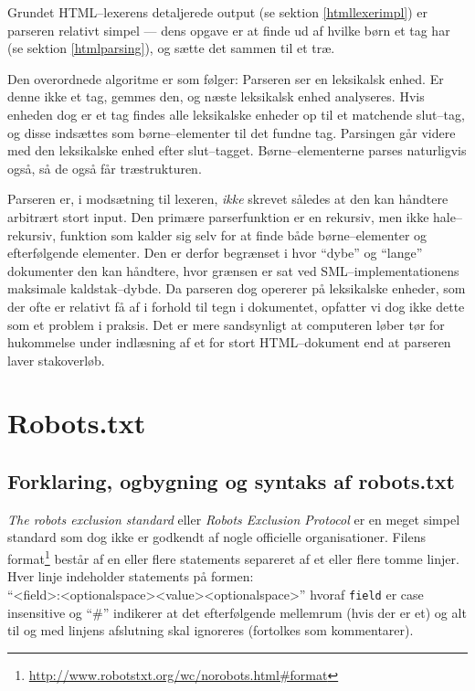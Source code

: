 \documentclass[a4paper,oneside]{memoir}
\begin{document}
Grundet HTML--lexerens detaljerede output (se sektion
\ref{htmllexerimpl}) er parseren relativt simpel --- dens opgave er at
finde ud af hvilke børn et tag har (se sektion \ref{htmlparsing}), og
sætte det sammen til et træ.

Den overordnede algoritme er som følger: Parseren ser en leksikalsk
enhed. Er denne ikke et tag, gemmes den, og næste leksikalsk enhed
analyseres. Hvis enheden dog er et tag findes alle leksikalske enheder
op til et matchende slut--tag, og disse indsættes som børne--elementer
til det fundne tag. Parsingen går videre med den leksikalske enhed
efter slut--tagget. Børne--elementerne parses naturligvis også, så de
også får træstrukturen.

Parseren er, i modsætning til lexeren, \textit{ikke} skrevet således
at den kan håndtere arbitrært stort input. Den primære parserfunktion
er en rekursiv, men ikke hale--rekursiv, funktion som kalder sig selv
for at finde både børne--elementer og efterfølgende elementer. Den er
derfor begrænset i hvor ``dybe'' og ``lange'' dokumenter den kan
håndtere, hvor grænsen er sat ved SML--implementationens maksimale
kaldstak--dybde. Da parseren dog opererer på leksikalske enheder, som
der ofte er relativt få af i forhold til tegn i dokumentet, opfatter
vi dog ikke dette som et problem i praksis. Det er mere sandsynligt at
computeren løber tør for hukommelse under indlæsning af et for stort
HTML--dokument end at parseren laver stakoverløb.

\section{Robots.txt}
\label{robots} 


\subsection{Forklaring, ogbygning og syntaks af robots.txt}

\textit{The robots exclusion standard} eller \textit{Robots Exclusion Protocol}
er en meget simpel standard som dog ikke er godkendt af nogle officielle
organisationer. 
Filens format\footnote{\url{http://www.robotstxt.org/wc/norobots.html\#format}}
består af en eller flere statements separeret af et eller flere tomme linjer.
Hver linje indeholder statements på formen:\\
``<field>:<optionalspace><value><optionalspace>'' hvoraf \texttt{field} er case
insensitive og ``\#'' indikerer at det efterfølgende mellemrum (hvis der er et)
og alt til og med linjens afslutning skal ignoreres (fortolkes som kommentarer).
\end{document}
